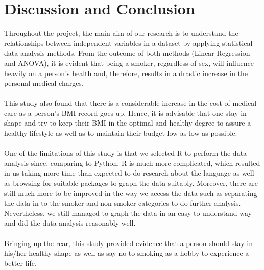 \documentclass[a4paper]{article}
\begin{document}
\section{Discussion and Conclusion}
Throughout the project, the main aim of our research is to understand the relationships between independent variables in a dataset by applying statistical data analysis methods. From the outcome of both methods (Linear Regression and ANOVA), it is evident that being a smoker, regardless of sex, will influence heavily on a person’s health and, therefore, results in a drastic increase in the personal medical charges. \\ \\
This study also found that there is a considerable increase in the cost of medical care as a person’s BMI record goes up. Hence, it is advisable that one stay in shape and try to keep their BMI in the optimal and healthy degree to assure a healthy lifestyle as well as to maintain their budget low as low as possible. \\ \\
One of the limitations of this study is that we selected R to perform the data analysis since, comparing to Python, R is much more complicated, which resulted in us taking more time than expected to do research about the language as well as browsing for suitable packages to graph the data suitably. Moreover, there are still much more to be improved in the way we access the data such as separating the data in to the smoker and non-smoker categories to do further analysis. Nevertheless, we still managed to graph the data in an easy-to-understand way and did the data analysis reasonably well. \\ \\
Bringing up the rear, this study provided evidence that a person should stay in his/her healthy shape as well as say no to smoking as a hobby to experience a better life.
\newpage
\end{document}

